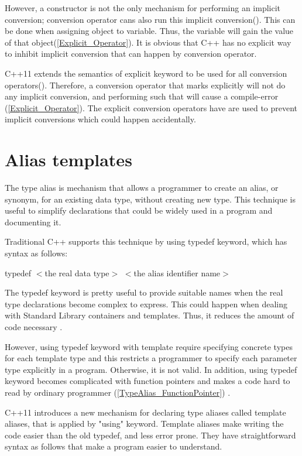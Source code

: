 \documentclass[11pt]{report}
\begin{document}
However, a constructor is not the only mechanism for performing an implicit conversion; conversion operator cans also run this implicit conversion(\cite{Gregorie:professionalcpp}). This can be done when assigning object to variable. Thus, the variable will gain the value of that object(\ref{Explicit_Operator}). It is obvious that C++ has no explicit way to inhibit implicit conversion that can happen by conversion operator.

C++11 extends the semantics of explicit keyword to be used for all conversion operators(\cite{Stroustrup:2012:Cpp11}). Therefore, a conversion operator that marks explicitly will not do any implicit conversion, and performing such that will cause a compile-error (\ref{Explicit_Operator}). The explicit conversion operators have are used to prevent implicit conversions which could happen accidentally.


\section{Alias templates}
\label{section: Alias templates}
The type alias is mechanism that allows a programmer to create an alias, or synonym, for an existing data type, without creating new type.  This technique is useful to simplify declarations that could be widely used in a program and documenting it.


Traditional C++ supports this technique by using typedef keyword, which has syntax as follows:
\begin{center}
 typedef $<$the real data type$>$ $<$the alias identifier name$>$
\end{center}

The typedef keyword is pretty useful to provide suitable names when the real type declarations become complex to express. This could happen when dealing with Standard Library containers and templates. Thus, it reduces the amount of code necessary \cite{Gregorie:professionalcpp}.


However, using typedef keyword with template require specifying concrete types for each template type and this restricts a programmer to specify each parameter type explicitly in a program. Otherwise, it is not valid. In addition, using typedef keyword becomes complicated with function pointers and makes a code hard to read by ordinary programmer (\ref{TypeAlias_FunctionPointer}) \cite{Gregorie:professionalcpp}.


C++11 introduces a new mechanism for declaring type aliases called template aliases, that is applied by "using" keyword.  Template aliases make writing the code easier than the old typedef, and less error prone. They have straightforward syntax as follows that make a program easier to understand.
\end{document}
